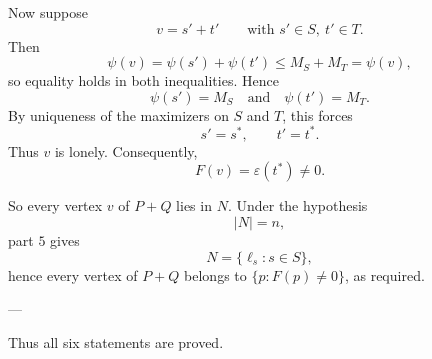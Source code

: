 Now suppose
\[
v=s'+t'
\qquad\text{with }s'\in S,\ t'\in T.
\]
Then
\[
\psi(v)=\psi(s')+\psi(t')\le M_S+M_T=\psi(v),
\]
so equality holds in both inequalities. Hence
\[
\psi(s')=M_S
\quad\text{and}\quad
\psi(t')=M_T.
\]
By uniqueness of the maximizers on \(S\) and \(T\), this forces
\[
s'=s^\ast,
\qquad
t'=t^\ast.
\]
Thus \(v\) is lonely. Consequently,
\[
F(v)=\varepsilon(t^\ast)\neq 0.
\]

So every vertex \(v\) of \(P+Q\) lies in \(N\). Under the hypothesis
\[
|N|=n,
\]
part \(5\) gives
\[
N=\{\ell_s:s\in S\},
\]
hence every vertex of \(P+Q\) belongs to \(\{p:F(p)\neq 0\}\), as required.

---

Thus all six statements are proved.